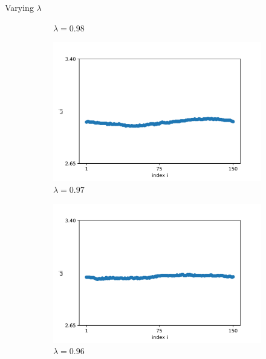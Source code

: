 \documentclass{beamer}
\begin{document}
\begin{frame}{Varying $\lambda$}
\begin{figure}[H]
\begin{subfigure}{.32\textwidth}
  \caption{$\lambda=0.98$}
\end{subfigure}
\begin{subfigure}{.32\textwidth}
  \centering
  \includegraphics[width=1\linewidth]{w_lambda=0.97_t=2000.png}  
  \caption{$\lambda=0.97$}
\end{subfigure}
\hfill
\begin{subfigure}{.32\textwidth}
  \centering
  \includegraphics[width=1\linewidth]{w_lambda=0.96_t=2000.png}  
  \caption{$\lambda=0.96$}
\end{subfigure}
\hfill
\begin{subfigure}{.32\textwidth}
  \centering

\end{subfigure}
\end{figure}
\end{frame}
\end{document}
